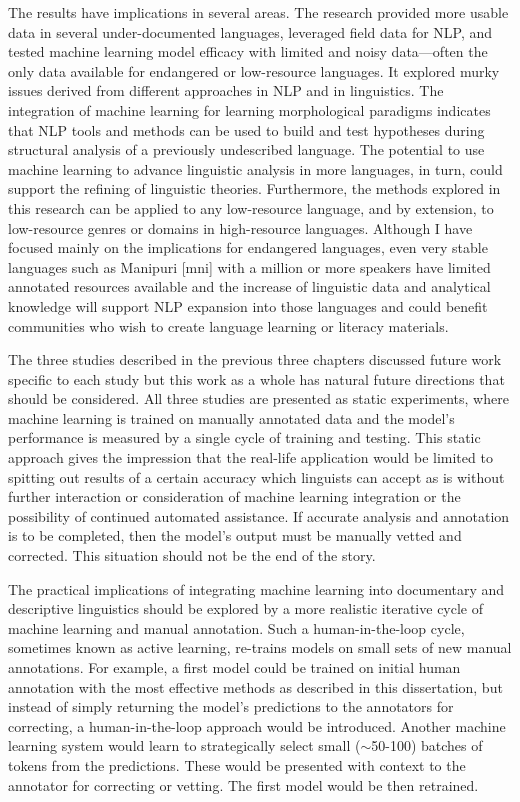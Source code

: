 The results have implications in several areas. The research provided more usable data in several under-documented languages, leveraged field data for NLP, and tested machine learning model efficacy with limited and noisy data---often the only data available for endangered or low-resource languages. It explored murky issues derived from different approaches in NLP and in linguistics. 
The integration of machine learning for learning morphological paradigms indicates that NLP tools and methods can be used to build and test hypotheses during structural analysis of a previously undescribed language. The potential to use machine learning to advance linguistic analysis in more languages, in turn, could support the refining of linguistic theories. Furthermore, the methods explored in this research can be applied to any low-resource language, and by extension, to low-resource genres or domains in high-resource languages. Although I have focused mainly on the implications for endangered languages, even very stable languages such as Manipuri [mni] with a million or more speakers have limited annotated resources available and the increase of linguistic data and analytical knowledge will support NLP expansion into those languages and could benefit communities who wish to create language learning or literacy materials. 

The three studies described in the previous three chapters discussed future work specific to each study but this work as a whole has natural future directions that should be considered. All three studies are presented as static experiments, where machine learning is trained on manually annotated data and the model's performance is measured by a single cycle of training and testing. This static approach gives the impression that the real-life application would be limited to spitting out results of a certain accuracy which linguists can accept as is without further interaction or consideration of machine learning integration or the possibility of continued automated assistance. If accurate analysis and annotation is to be completed, then the model's output must be manually vetted and corrected. This situation should not be the end of the story. 

The practical implications of integrating machine learning into documentary and descriptive linguistics should be explored by a more realistic iterative cycle of machine learning and manual annotation. Such a human-in-the-loop cycle, sometimes known as active learning, re-trains models on small sets of new manual annotations. 
For example, a first model could be trained on initial human annotation with the most effective methods as described in this dissertation, but instead of simply returning the model's predictions to the annotators for correcting, a human-in-the-loop approach would be introduced. Another machine learning system would learn to strategically select small ($\sim$50-100) batches of tokens from the predictions. These would be presented with context to the annotator for correcting or vetting. The first model would be then retrained. 

